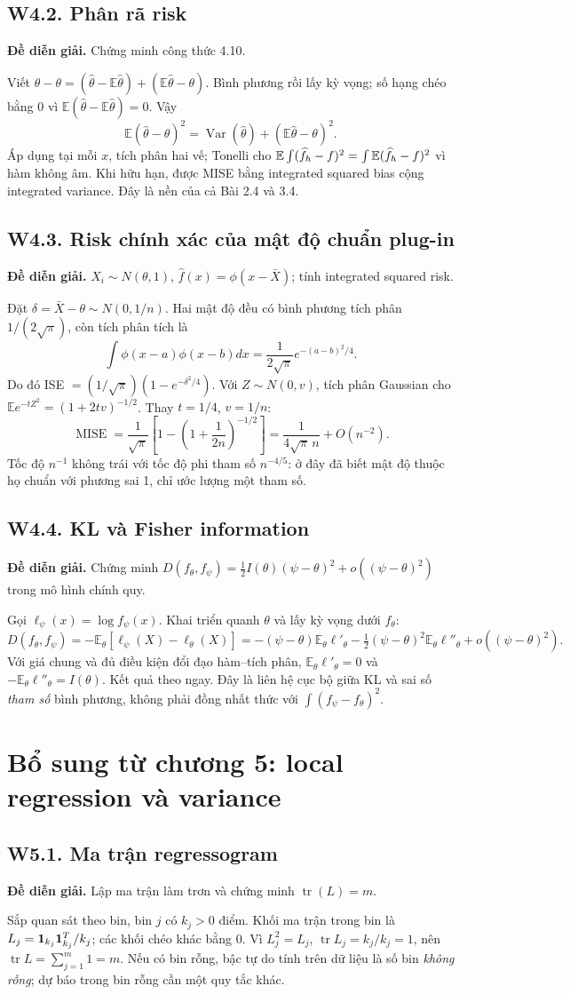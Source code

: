 \documentclass[11pt,a4paper]{article}
\newcommand{\E}{\mathbb E}\newcommand{\Pp}{\mathbb P}
\DeclareMathOperator{\Var}{Var}\DeclareMathOperator{\Cov}{Cov}
\DeclareMathOperator{\MISE}{MISE}\DeclareMathOperator{\AMISE}{AMISE}
\DeclareMathOperator{\tr}{tr}\DeclareMathOperator{\se}{se}
\newcommand{\supp}[3]{\subsection{#1. #2}\label{s:#1}\textbf{Đề diễn giải.} #3\par}
\begin{document}
\supp{W4.2}{Phân rã risk}{Chứng minh công thức 4.10.}
Viết $\widehat\theta-\theta=(\widehat\theta-\E\widehat\theta)+(\E\widehat\theta-\theta)$. Bình phương rồi lấy kỳ vọng; số hạng chéo bằng 0 vì $\E(\widehat\theta-\E\widehat\theta)=0$. Vậy
\[
\E(\widehat\theta-\theta)^2=\Var(\widehat\theta)+(\E\widehat\theta-\theta)^2.
\]
Áp dụng tại mỗi $x$, tích phân hai vế; Tonelli cho $\E\int(\fh-f)^2=\int\E(\fh-f)^2$ vì hàm không âm. Khi hữu hạn, được MISE bằng integrated squared bias cộng integrated variance. Đây là nền của cả Bài 2.4 và 3.4.

\supp{W4.3}{Risk chính xác của mật độ chuẩn plug-in}{$X_i\sim N(\theta,1)$, $\widehat f(x)=\phi(x-\bar X)$; tính integrated squared risk.}
Đặt $\delta=\bar X-\theta\sim N(0,1/n)$. Hai mật độ đều có bình phương tích phân $1/(2\sqrt\pi)$, còn tích phân tích là
\[
\int\phi(x-a)\phi(x-b)dx=\frac1{2\sqrt\pi}e^{-(a-b)^2/4}.
\]
Do đó ISE $=(1/\sqrt\pi)(1-e^{-\delta^2/4})$. Với $Z\sim N(0,v)$, tích phân Gaussian cho $\E e^{-tZ^2}=(1+2tv)^{-1/2}$. Thay $t=1/4$, $v=1/n$:
\[
\MISE=\frac1{\sqrt\pi}\left[1-\left(1+\frac1{2n}\right)^{-1/2}\right]
=\frac1{4\sqrt\pi\,n}+O(n^{-2}).
\]
Tốc độ $n^{-1}$ không trái với tốc độ phi tham số $n^{-4/5}$: ở đây đã biết mật độ thuộc họ chuẩn với phương sai 1, chỉ ước lượng một tham số.

\supp{W4.4}{KL và Fisher information}{Chứng minh $D(f_\theta,f_\psi)=\frac12I(\theta)(\psi-\theta)^2+o((\psi-\theta)^2)$ trong mô hình chính quy.}
Gọi $\ell_\psi(x)=\log f_\psi(x)$. Khai triển quanh $\theta$ và lấy kỳ vọng dưới $f_\theta$:
\[
D(f_\theta,f_\psi)=-\E_\theta[\ell_\psi(X)-\ell_\theta(X)]
=-(\psi-\theta)\E_\theta\ell'_\theta-\tfrac12(\psi-\theta)^2\E_\theta\ell''_\theta+o((\psi-\theta)^2).
\]
Với giá chung và đủ điều kiện đổi đạo hàm--tích phân, $\E_\theta\ell'_\theta=0$ và
$-\E_\theta\ell''_\theta=I(\theta)$. Kết quả theo ngay. Đây là liên hệ cục bộ giữa KL và sai số \emph{tham số} bình phương, không phải đồng nhất thức với $\int(f_\psi-f_\theta)^2$.

\section{Bổ sung từ chương 5: local regression và variance}
\supp{W5.1}{Ma trận regressogram}{Lập ma trận làm trơn và chứng minh $\tr(L)=m$.}
Sắp quan sát theo bin, bin $j$ có $k_j>0$ điểm. Khối ma trận trong bin là
$L_j=\mathbf 1_{k_j}\mathbf 1_{k_j}^T/k_j$; các khối chéo khác bằng 0. Vì $L_j^2=L_j$,
$\tr L_j=k_j/k_j=1$, nên $\tr L=\sum_{j=1}^m1=m$. Nếu có bin rỗng, bậc tự do tính trên dữ liệu là số bin \emph{không rỗng}; dự báo trong bin rỗng cần một quy tắc khác.
\end{document}

